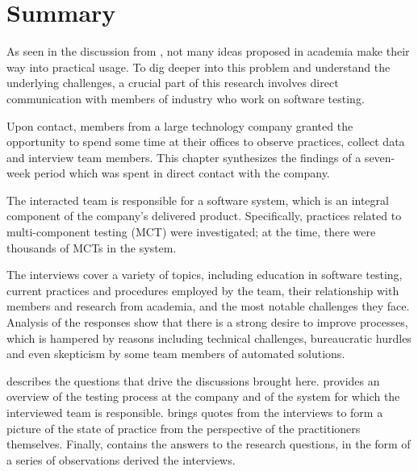 \section{Summary}\label{sec:ind_summary}

As seen in the discussion from , not many ideas proposed in academia make their way into practical usage.
To dig deeper into this problem and understand the underlying challenges, a crucial part of this research involves direct communication with members of industry who work on software testing.

Upon contact, members from a large technology company granted the opportunity to spend some time at their offices to observe practices, collect data and interview team members.
This chapter synthesizes the findings of a seven-week period which was spent in direct contact with the company.

The interacted team is responsible for a software system, which is an integral component of the company's delivered product.
Specifically, practices related to multi-component testing (MCT) were investigated; at the time, there were thousands of MCTs in the system.

The interviews cover a variety of topics, including education in software testing, current practices and procedures employed by the team, their relationship with members and research from academia, and the most notable challenges they face.
Analysis of the responses show that there is a strong desire to improve processes, which is hampered by reasons including technical challenges, bureaucratic hurdles and even skepticism by some team members of automated solutions.

 describes the questions that drive the discussions brought here.
 provides an overview of the testing process at the company and of the system for which the interviewed team is responsible.
 brings quotes from the interviews to form a picture of the state of practice from the perspective of the practitioners themselves.
Finally,  contains the answers to the research questions, in the form of a series of observations derived the interviews.



